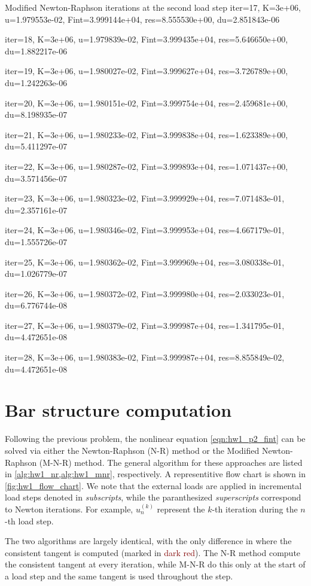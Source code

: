 \begin{codenv}{Modified Newton-Raphson iterations at the second load step}
iter=17, K=3e+06, u=1.979553e-02, Fint=3.999144e+04, res=8.555530e+00, du=2.851843e-06

iter=18, K=3e+06, u=1.979839e-02, Fint=3.999435e+04, res=5.646650e+00, du=1.882217e-06

iter=19, K=3e+06, u=1.980027e-02, Fint=3.999627e+04, res=3.726789e+00, du=1.242263e-06

iter=20, K=3e+06, u=1.980151e-02, Fint=3.999754e+04, res=2.459681e+00, du=8.198935e-07

iter=21, K=3e+06, u=1.980233e-02, Fint=3.999838e+04, res=1.623389e+00, du=5.411297e-07

iter=22, K=3e+06, u=1.980287e-02, Fint=3.999893e+04, res=1.071437e+00, du=3.571456e-07

iter=23, K=3e+06, u=1.980323e-02, Fint=3.999929e+04, res=7.071483e-01, du=2.357161e-07

iter=24, K=3e+06, u=1.980346e-02, Fint=3.999953e+04, res=4.667179e-01, du=1.555726e-07

iter=25, K=3e+06, u=1.980362e-02, Fint=3.999969e+04, res=3.080338e-01, du=1.026779e-07

iter=26, K=3e+06, u=1.980372e-02, Fint=3.999980e+04, res=2.033023e-01, du=6.776744e-08

iter=27, K=3e+06, u=1.980379e-02, Fint=3.999987e+04, res=1.341795e-01, du=4.472651e-08

iter=28, K=3e+06, u=1.980383e-02, Fint=3.999987e+04, res=8.855849e-02, du=4.472651e-08

\end{codenv}

\section{Bar structure computation}
Following the previous problem, the nonlinear equation \cref{eqn:hw1_p2_fint} can be solved via either the Newton-Raphson (N-R) method or the Modified Newton-Raphson (M-N-R) method. 
The general algorithm for these approaches are listed in \cref{alg:hw1_nr,alg:hw1_mnr}, respectively. 
A representitive flow chart is shown in \cref{fig:hw1_flow_chart}.
We note that the external loads are applied in incremental load steps denoted in \emph{subscripts}, while the paranthesized \emph{superscripts} correspond to Newton iterations.
For example, $u_n^{(k)}$ represent the $k$-th iteration during the $n$-th load step. 

The two algorithms are largely identical, with the only difference in where the consistent tangent is computed (marked in \textcolor{Maroon}{dark red}).
The N-R method compute the consistent tangent at every iteration, while M-N-R do this only at the start of a load step and the same tangent is used throughout the step. 

